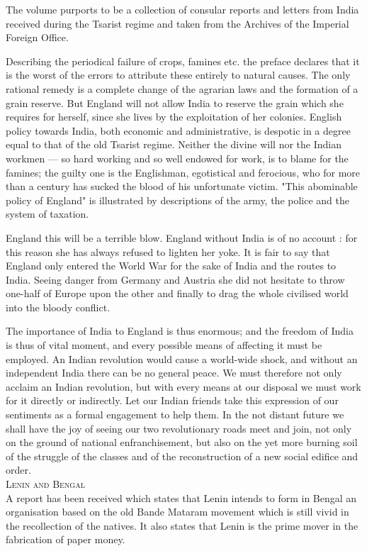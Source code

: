 The volume purports to be a collection of consular reports and letters from India received during the Tsarist regime and taken from the Archives of the Imperial Foreign Office. 

Describing the periodical failure of crops, famines etc. the preface declares that it is the worst of the errors to attribute these entirely to natural causes. The only rational remedy is a complete change of the agrarian laws and the formation of a grain reserve. But England will not allow India to reserve the grain which she requires for herself, since she lives by the exploitation of her colonies. English policy towards India, both economic and administrative, is despotic in a degree equal to that of the old Tsarist regime. Neither the divine will nor the Indian workmen — so hard working and so well endowed for work, is to blame for the famines; the guilty one is the Englishman, egotistical and ferocious, who for more than a century has sucked the blood of his unfortunate victim. "This abominable policy of England" is illustrated by descriptions of the army, the police and the system of taxation.

England this will be a terrible blow. England without India is of no account : for this reason she has always refused to lighten her yoke. It is fair to say that England only entered the World War for the sake of India and the routes to India. Seeing danger from Germany and Austria she did not hesitate to throw one-half of Europe upon the other and finally to drag the whole civilised world into the bloody conflict. 

The importance of India to England is thus enormous; and the freedom of India is thus of vital moment, and every possible means of affecting it must be employed. An Indian revolution would cause a world-wide shock, and without an independent India there can be no general peace. We must therefore not only acclaim an Indian revolution, but with every means at our disposal we must work for it directly or indirectly. Let our Indian friends take this expression of our sentiments as a formal engagement to help them. In the not distant future we shall have the joy of seeing our two revolutionary roads meet and join, not only on the ground of national enfranchisement, but also on the yet more burning soil of the struggle of the classes and of the reconstruction of a new social edifice and order. \\


\textsc{Lenin and Bengal}\\

A report has been received which states that Lenin intends to form in Bengal an organisation based on the old Bande Mataram movement which is still vivid in the recollection of the natives. It also states that Lenin is the prime mover in the fabrication of paper money.
